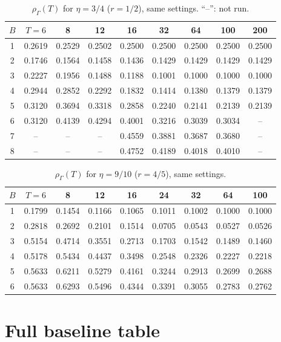 \documentclass{article}
\theoremstyle{plain}
\theoremstyle{definition}
\theoremstyle{remark}
\newcommand{\rhoG}{\rho_\Gamma}
\begin{document}
\begin{table}[h]
\centering
\caption{$\rhoG(T)$ for $\eta=3/4$ ($r=1/2$), same settings. ``--'': not run.}
\small
\begin{tabular}{ccccccccc}
\toprule
$B$ & $T=6$ & 8 & 12 & 16 & 32 & 64 & 100 & 200\\
\midrule
1 & 0.2619 & 0.2529 & 0.2502 & 0.2500 & 0.2500 & 0.2500 & 0.2500 & 0.2500\\
2 & 0.1746 & 0.1564 & 0.1458 & 0.1436 & 0.1429 & 0.1429 & 0.1429 & 0.1429\\
3 & 0.2227 & 0.1956 & 0.1488 & 0.1188 & 0.1001 & 0.1000 & 0.1000 & 0.1000\\
4 & 0.2944 & 0.2852 & 0.2292 & 0.1832 & 0.1414 & 0.1380 & 0.1379 & 0.1379\\
5 & 0.3120 & 0.3694 & 0.3318 & 0.2858 & 0.2240 & 0.2141 & 0.2139 & 0.2139\\
6 & 0.3120 & 0.4139 & 0.4294 & 0.4001 & 0.3216 & 0.3039 & 0.3034 & --\\
7 & -- & -- & -- & 0.4559 & 0.3881 & 0.3687 & 0.3680 & --\\
8 & -- & -- & -- & 0.4752 & 0.4189 & 0.4018 & 0.4010 & --\\
\bottomrule
\end{tabular}
\end{table}

\begin{table}[h]
\centering
\caption{$\rhoG(T)$ for $\eta=9/10$ ($r=4/5$), same settings.}
\small
\begin{tabular}{ccccccccc}
\toprule
$B$ & $T=6$ & 8 & 12 & 16 & 24 & 32 & 64 & 100\\
\midrule
1 & 0.1799 & 0.1454 & 0.1166 & 0.1065 & 0.1011 & 0.1002 & 0.1000 & 0.1000\\
2 & 0.2818 & 0.2692 & 0.2101 & 0.1514 & 0.0705 & 0.0543 & 0.0527 & 0.0526\\
3 & 0.5154 & 0.4714 & 0.3551 & 0.2713 & 0.1703 & 0.1542 & 0.1489 & 0.1460\\
4 & 0.5178 & 0.5434 & 0.4437 & 0.3498 & 0.2548 & 0.2326 & 0.2227 & 0.2218\\
5 & 0.5633 & 0.6211 & 0.5279 & 0.4161 & 0.3244 & 0.2913 & 0.2699 & 0.2688\\
6 & 0.5633 & 0.6293 & 0.5496 & 0.4344 & 0.3391 & 0.3055 & 0.2783 & 0.2762\\
\bottomrule
\end{tabular}
\end{table}
\FloatBarrier

\section{Full baseline table}
\label{app:e4}
\end{document}
